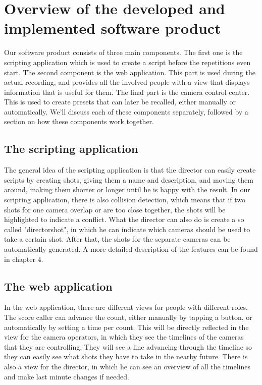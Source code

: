 \section{Overview of the developed and implemented software product}

Our software product consists of three main components. The first one is the scripting application which is used to create a script before the repetitions even start. The second component is the web application. This part is used during the actual recording, and provides all the involved people with a view that displays information that is useful for them. The final part is the camera control center. This is used to create presets that can later be recalled, either manually or automatically. We'll discuss each of these components separately, followed by a section on how these components work together.

\subsection*{The scripting application}
The general idea of the scripting application is that the director can easily create scripts by creating shots, giving them a name and description, and moving them around, making them shorter or longer until he is happy with the result. In our scripting application, there is also collision detection, which means that if two shots for one camera overlap or are too close together, the shots will be highlighted to indicate a conflict. What the director can also do is create a so called "directorshot", in which he can indicate which cameras should be used to take a certain shot. After that, the shots for the separate cameras can be automatically generated. A more detailed description of the features can be found in chapter 4.

\subsection*{The web application}
In the web application, there are different views for people with different roles. The score caller can advance the count, either manually by tapping a button, or automatically by setting a time per count. This will be directly reflected in the view for the camera operators, in which they see the timelines of the cameras that they are controlling. They will see a line advancing through the timeline so they can easily see what shots they have to take in the nearby future. There is also a view for the director, in which he can see an overview of all the timelines and make last minute changes if needed. 

